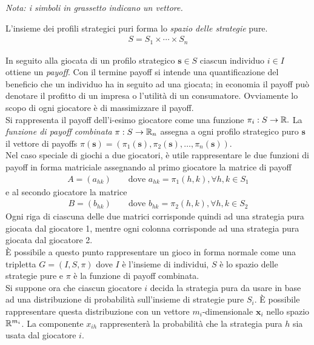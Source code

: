 \emph{Nota: i simboli in grassetto indicano un vettore.}

\newpage

L’insieme dei profili strategici puri forma lo \emph{spazio delle strategie} pure.
\begin{align}
	S = S_1 \times \cdots \times S_n
\end{align}

In seguito alla giocata di un profilo strategico $\mathbf{s} \in S$ ciascun individuo $i \in I$ ottiene un \emph{payoff}. Con il termine payoff si intende una quantificazione del beneficio che un individuo ha in seguito ad una giocata; in economia il payoff può denotare il profitto di un impresa o l’utilità di un consumatore. Ovviamente lo scopo di ogni giocatore è di massimizzare il payoff. \\

Si rappresenta il payoff dell’i-esimo giocatore come una funzione $\pi_i : S \rightarrow \mathbb{R}.$ La \emph{funzione di payoff combinata} $\pi : S \rightarrow \mathbb{R}_n$ assegna a ogni profilo strategico puro $\mathbf{s}$ il vettore di payoffs $\pi(\mathbf{s}) = (\pi_1(\mathbf{s}), \pi_2(\mathbf{s}), \dots , \pi_n(\mathbf{s}))$.\\

Nel caso speciale di giochi a due giocatori, è utile rappresentare le due funzioni di payoff in forma matriciale assegnando al primo giocatore la matrice di payoff 
\begin{align*}
	A = (a_{hk}) \qquad \text{dove } a_{hk} = \pi_1(h, k), \forall h,k \in S_1
\end{align*}
e al secondo giocatore la matrice 
\begin{align*}
	B = (b_{hk}) \qquad \text{dove } b_{hk} = \pi_2(h, k), \forall h,k \in S_2
\end{align*}
Ogni riga di ciascuna delle due matrici corrisponde quindi ad una strategia pura giocata dal giocatore 1, mentre ogni colonna corrisponde ad una strategia pura giocata dal giocatore 2.\\

È possibile a questo punto rappresentare un gioco in forma normale come una tripletta $G = (I, S, \pi)$ dove $I$ è l’insieme di individui, $S$ è lo spazio delle strategie pure e $\pi$ è la funzione di payoff combinata.\\

Si suppone ora che ciascun giocatore $i$ decida la strategia pura da usare in base ad una distribuzione di probabilità sull’insieme di strategie pure $S_i$. È possibile rappresentare questa distribuzione con un vettore $m_i$-dimensionale $\mathbf{x}_i$ nello spazio $\mathbb{R}^{m_i}$. La componente $x_{ih}$ rappresenterà la probabilità che la strategia pura $h$ sia usata dal giocatore $i$.\\


